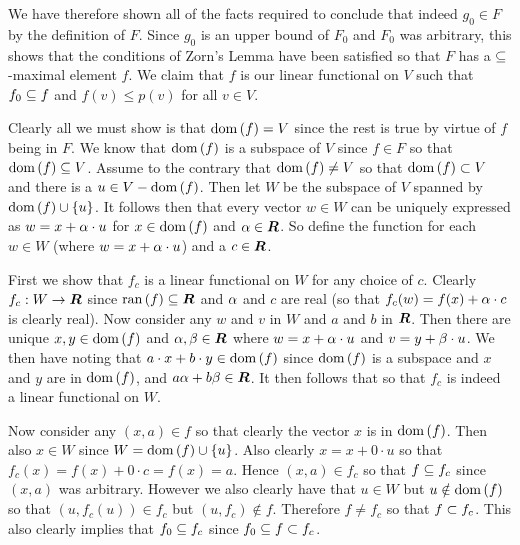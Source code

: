 \begin{questions}
{{    We have therefore shown all of the facts required to conclude that indeed $g_0 \in F$ by the definition of $F$.
    Since $g_0$ is an upper bound of $F_0$ and $F_0$ was arbitrary, this shows that the conditions of Zorn's Lemma have been satisfied so that $F$ has a $\ss$-maximal element $f$.
    We claim that $f$ is our linear functional on $V$ such that $f_0 \ss f$ and $f(v) \leq p(v)$ for all $v \in V$.

    Clearly all we must show is that $\dom(f) = V$ since the rest is true by virtue of $f$ being in $F$.
    We know that $\dom(f)$ is a subspace of $V$ since $f \in F$ so that $\dom(f) \ss V$.
    Assume to the contrary that $\dom(f) \neq V$ so that $\dom(f) \pss V$ and there is a $u \in V - \dom(f)$.
    Then let $W$ be the subspace of $V$ spanned by $\dom(f) \cup \braces{u}$.
    It follows then that every vector $w \in W$ can be uniquely expressed as $w = x + \a \cdot u$ for $x \in \dom(f)$ and $\a \in \reals$.
    So define the function
    for each $w \in W$ (where $w = x + \a \cdot u$) and a $c \in \reals$.

    First we show that $f_c$ is a linear functional on $W$ for any choice of $c$.
    Clearly $f_c : W \to \reals$ since $\ran(f) \ss \reals$ and $\a$ and $c$ are real (so that $f_c(w) = f(x) + \a \cdot c$ is clearly real).
    Now consider any $w$ and $v$ in $W$ and $a$ and $b$ in $\reals$.
    Then there are unique $x,y \in \dom(f)$ and $\a,\b \in \reals$ where $w = x + \a \cdot u$ and $v = y + \b \cdot u$.
    We then have
    noting that $a \cdot x + b \cdot y \in \dom(f)$ since $\dom(f)$ is a subspace and $x$ and $y$ are in $\dom(f)$, and $a\a + b \b \in \reals$.
    It then follows that
    so that $f_c$ is indeed a linear functional on $W$.

    Now consider any $(x, a) \in f$ so that clearly the vector $x$ is in $\dom(f)$.
    Then also $x \in W$ since $W = \dom(f) \cup \braces{u}$.
    Also clearly $x = x + 0 \cdot u$ so that $f_c(x) = f(x) + 0 \cdot c = f(x) = a$.
    Hence $(x, a) \in f_c$ so that $f \ss f_c$ since $(x,a)$ was arbitrary.
    However we also clearly have that $u \in W$ but $u \notin \dom(f)$ so that $(u, f_c(u)) \in f_c$ but $(u, f_c) \notin f$.
    Therefore $f \neq f_c$ so that $f \pss f_c$.
    This also clearly implies that $f_0 \ss f_c$ since $f_0 \ss f \pss f_c$.

}}
\end{questions}
